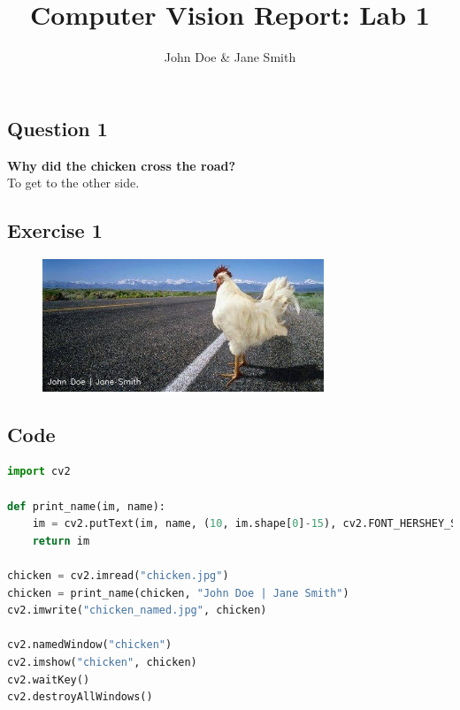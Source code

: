\documentclass[10pt]{article}
\begin{document}
\title{Computer Vision Report: Lab 1}
\author{John Doe \& Jane Smith}
\date{}
\maketitle

\subsection*{Question 1}
\textbf{Why did the chicken cross the road?}\\
To get to the other side.

\subsection*{Exercise 1}

\begin{figure}[h]
\begin{center}
\includegraphics[width=0.75\textwidth]{chicken_named.jpg}
\end{center}
\end{figure}

\subsection*{Code}
\begin{lstlisting}[language=Python]
import cv2

def print_name(im, name):
	im = cv2.putText(im, name, (10, im.shape[0]-15), cv2.FONT_HERSHEY_SIMPLEX, 0.5, (255,255,255), 1, cv2.LINE_AA)
	return im

chicken = cv2.imread("chicken.jpg")
chicken = print_name(chicken, "John Doe | Jane Smith")
cv2.imwrite("chicken_named.jpg", chicken)

cv2.namedWindow("chicken")
cv2.imshow("chicken", chicken)
cv2.waitKey()
cv2.destroyAllWindows()
\end{lstlisting}
\end{document}
